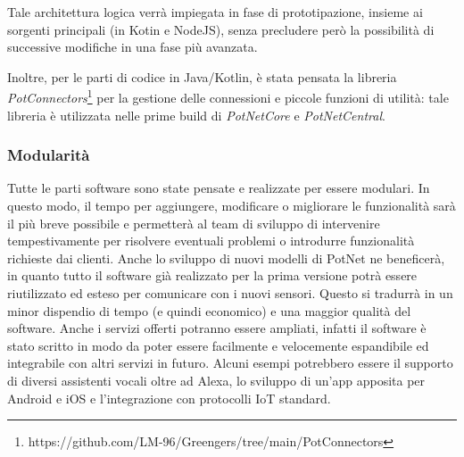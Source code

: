 Tale architettura logica verrà impiegata in fase di prototipazione, insieme ai sorgenti principali (in Kotin e NodeJS), senza precludere però la possibilità di successive modifiche in una fase più avanzata.

Inoltre, per le parti di codice in Java/Kotlin, è stata pensata la libreria \textit{PotConnectors}\footnote{https://github.com/LM-96/Greengers/tree/main/PotConnectors} per la gestione delle connessioni e piccole funzioni di utilità: tale libreria è utilizzata nelle prime build di \textit{PotNetCore} e \textit{PotNetCentral}.

\subsubsection{Modularità}

Tutte le parti software sono state pensate e realizzate per essere modulari. In questo modo, il tempo per aggiungere, modificare o migliorare le funzionalità sarà il più breve possibile e permetterà al team di sviluppo di intervenire tempestivamente per risolvere eventuali problemi o introdurre funzionalità richieste dai clienti.
\newline Anche lo sviluppo di nuovi modelli di PotNet ne beneficerà, in quanto tutto il software già realizzato per la prima versione potrà essere riutilizzato ed esteso per comunicare con i nuovi sensori. Questo si tradurrà in un minor dispendio di tempo (e quindi economico) e una maggior qualità del software.
\newline\newline Anche i servizi offerti potranno essere ampliati, infatti il software è stato scritto in modo da poter essere facilmente e velocemente espandibile ed integrabile con altri servizi in futuro. Alcuni esempi potrebbero essere il supporto di diversi assistenti vocali oltre ad Alexa, lo sviluppo di un'app apposita per Android e iOS e l'integrazione con protocolli IoT standard.